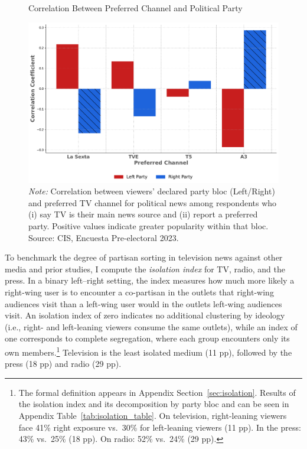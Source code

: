 \documentclass[12pt]{article}
\begin{document}
	
	\begin{figure}[!htbp]
		\centering
		\caption{Correlation Between Preferred Channel and Political Party}
		\includegraphics[width=120mm]{figures/corr_party_channel3}
		\caption*{\small \textit{Note:} Correlation between viewers’ declared party bloc (Left/Right) and preferred TV channel for political news among respondents who (i) say TV is their main news source and (ii) report a preferred party. Positive values indicate greater popularity within that bloc. Source: CIS, Encuesta Pre-electoral 2023.}
		\label{fig:opinion}
	\end{figure}
	
	
	
	
	
	To benchmark the degree of partisan sorting in television news against other media and prior studies, I compute the \emph{isolation index} \citep{gentzkow_isolation} for TV, radio, and the press. In a binary left–right setting, the index measures how much more likely a right-wing user is to encounter a co-partisan in the outlets that right-wing audiences visit than a left-wing user would in the outlets left-wing audiences visit. An isolation index of zero indicates no additional clustering by ideology (i.e., right- and left-leaning viewers consume the same outlets), while an index of one corresponds to complete segregation, where each group encounters only its own members.\footnote{The formal definition appears in Appendix  Section~\ref{sec:isolation}. Results of the isolation index and its decomposition by party bloc and can be seen in  Appendix Table~\ref{tab:isolation_table}. On television, right-leaning viewers face 41\% right exposure vs.\ 30\% for left-leaning viewers (11 pp). In the press: 43\% vs.\ 25\% (18 pp). On radio: 52\% vs.\ 24\% (29 pp).} Television is the least isolated medium (11 pp), followed by the press (18 pp) and radio (29 pp).
	
\end{document}
